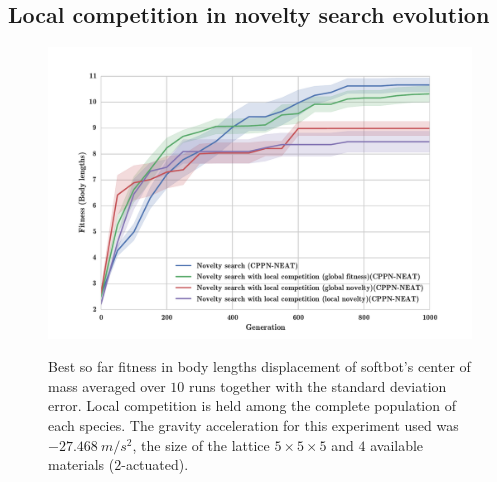 \clearpage
\subsection{Local competition in novelty search evolution}

\begin{figure}[h!]
{\centering
\includegraphics[width=1.0\textwidth]{../Figures/Results/NoveltyCompetitionsSize5.pdf}}
\caption{Best so far fitness in body lengths displacement of softbot's center of mass averaged over $10$ runs together with the standard deviation error. Local competition is held among the complete population of each species. The gravity acceleration for this experiment used was $-27.468\   m/s^2$, the size of the lattice $5\times 5\times5$ and $4$ available materials ($2$-actuated).}
\label{fig:NoveltyCompetitionsSize5}
\end{figure}